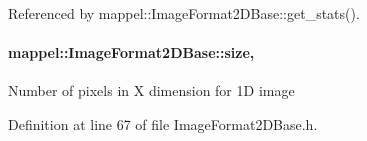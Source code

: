 Referenced by mappel\+::\+Image\+Format2\+D\+Base\+::get\+\_\+stats().

\paragraph[{\texorpdfstring{size}{size}}]{ mappel\+::\+Image\+Format2\+D\+Base\+::size\hspace{0.3cm}{\ttfamily [protected]}, {\ttfamily [inherited]}}\hypertarget{classmappel_1_1ImageFormat2DBase_a3be77d2aa6ec9f3815322732950c2a60}{}\label{classmappel_1_1ImageFormat2DBase_a3be77d2aa6ec9f3815322732950c2a60}
Number of pixels in X dimension for 1D image 

Definition at line 67 of file Image\+Format2\+D\+Base.\+h.



